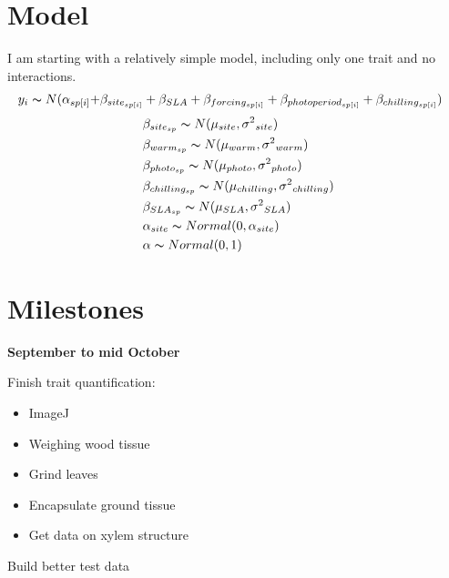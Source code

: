 \documentclass[11pt,a4paper,oneside]{article}
\begin{document}
\section*{Model}

I am starting with a relatively simple model, including only one trait and no interactions. 
\begin{align*}
y_i \thicksim N(\alpha_{sp[i]} +& \beta_{site_{sp[i]}} + \beta_{SLA}+ \beta_{forcing_{sp[i]}} + \beta_{photoperiod_{sp[i]}} + \beta_{chilling_{sp[i]}})
\end{align*}
\begin{align*}
& \; \beta_{site_{sp}} \thicksim N(\mu_{site}, \sigma{^2}_{site}) \\
& \; \beta_{warm_{sp}} \thicksim N(\mu_{warm}, \sigma{^2}_{warm}) \\
& \; \beta_{photo_{sp}} \thicksim N(\mu_{photo}, \sigma{^2}_{photo}) \\
& \; \beta_{chilling_{sp}} \thicksim N(\mu_{chilling}, \sigma{^2}_{chilling}) \\
& \; \beta_{SLA_{sp}} \thicksim N(\mu_{SLA}, \sigma{^2}_{SLA}) \\
& \; \alpha_{site} \thicksim Normal (0,\alpha_{site})\\
& \; \alpha \thicksim Normal (0,1)\\
\end{align*}

\section*{Milestones}

\textbf{September to mid October}
\par Finish trait quantification:
\begin{itemize}
\item ImageJ
\item Weighing wood tissue
\item Grind leaves
\item Encapsulate ground tissue
\item Get data on xylem structure 
\end{itemize}
\par Build better test data
\end{document}
